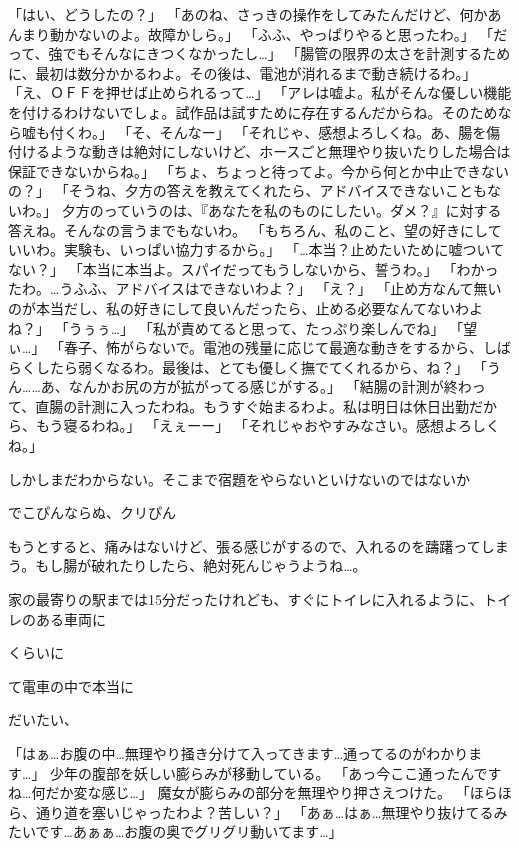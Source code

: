 「はい、どうしたの？」
「あのね、さっきの操作をしてみたんだけど、何かあんまり動かないのよ。故障かしら。」
「ふふ、やっぱりやると思ったわ。」
「だって、強でもそんなにきつくなかったし…」
「腸管の限界の太さを計測するために、最初は数分かかるわよ。その後は、電池が消れるまで動き続けるわ。」
「え、ＯＦＦを押せば止められるって…」
「アレは嘘よ。私がそんな優しい機能を付けるわけないでしょ。試作品は試すために存在するんだからね。そのためなら嘘も付くわ。」
「そ、そんなー」
「それじゃ、感想よろしくね。あ、腸を傷付けるような動きは絶対にしないけど、ホースごと無理やり抜いたりした場合は保証できないからね。」
「ちょ、ちょっと待ってよ。今から何とか中止できないの？」
「そうね、夕方の答えを教えてくれたら、アドバイスできないこともないわ。」
夕方のっていうのは、『あなたを私のものにしたい。ダメ？』に対する答えね。そんなの言うまでもないわ。
「もちろん、私のこと、望の好きにしていいわ。実験も、いっぱい協力するから。」
「…本当？止めたいために嘘ついてない？」
「本当に本当よ。スパイだってもうしないから、誓うわ。」
「わかったわ。…うふふ、アドバイスはできないわよ？」
「え？」
「止め方なんて無いのが本当だし、私の好きにして良いんだったら、止める必要なんてないわよね？」
「うぅぅ…」
「私が責めてると思って、たっぷり楽しんでね」
「望ぃ…」
「春子、怖がらないで。電池の残量に応じて最適な動きをするから、しばらくしたら弱くなるわ。最後は、とても優しく撫でてくれるから、ね？」
「うん……あ、なんかお尻の方が拡がってる感じがする。」
「結腸の計測が終わって、直腸の計測に入ったわね。もうすぐ始まるわよ。私は明日は休日出勤だから、もう寝るわね。」
「えぇーー」
「それじゃおやすみなさい。感想よろしくね。」








しかしまだわからない。そこまで宿題をやらないといけないのではないか




でこぴんならぬ、クリぴん


もうとすると、痛みはないけど、張る感じがするので、入れるのを躊躇ってしまう。もし腸が破れたりしたら、絶対死んじゃうようね…。






家の最寄りの駅までは15分だったけれども、すぐにトイレに入れるように、トイレのある車両に

くらいに

て電車の中で本当に

だいたい、






「はぁ…お腹の中…無理やり掻き分けて入ってきます…通ってるのがわかります…」
少年の腹部を妖しい膨らみが移動している。
「あっ今ここ通ったんですね…何だか変な感じ…」
魔女が膨らみの部分を無理やり押さえつけた。
「ほらほら、通り道を塞いじゃったわよ？苦しい？」
「あぁ…はぁ…無理やり抜けてるみたいです…あぁぁ…お腹の奥でグリグリ動いてます…」








